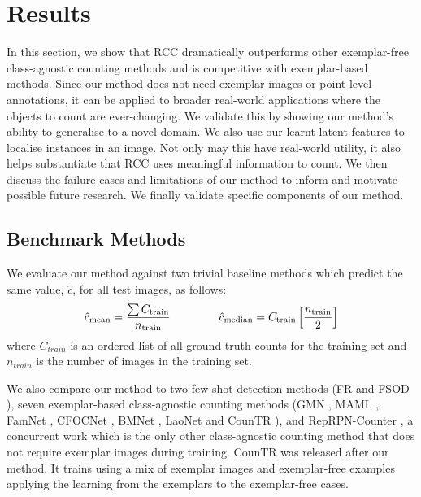 \documentclass[../thesis.tex]{subfiles}
\begin{document}
\section{Results}
In this section, we show that RCC dramatically outperforms other exemplar-free class-agnostic counting methods and is competitive with exemplar-based methods. Since our method does not need exemplar images or point-level annotations, it can be applied to broader real-world applications where the objects to count are ever-changing. 
We validate this by showing our method's ability to generalise to a novel domain. 
We also use our learnt latent features to localise instances in an image.
Not only may this have real-world utility, it also helps substantiate that RCC uses meaningful information to count. We then discuss the failure cases and limitations of our method to inform and motivate possible future research. We finally validate specific components of our method.

\subsection{Benchmark Methods}\label{sec__LTCA__benchmarking_methods}
We evaluate our method against two trivial baseline methods which predict the same value, $\hat{c}$, for all test images, as follows:
\begin{equation}
    \hat{c}_{\text{mean}} = \frac{\sum C_{\text{train}}}{n_{\text{train}}}\hspace{15mm}
 \hat{c}_{\text{median}} = C_{\text{train}}\left[\frac{n_{\text{train}}}{2}\right]
 \end{equation}
where $C_{train}$ is an ordered list of all ground truth counts for the training set and $n_{train}$ is the number of images in the training set.

We also compare our method to two few-shot detection methods (FR \cite{kang2019few} and FSOD \cite{fan2020few}), seven exemplar-based class-agnostic counting methods (GMN \cite{Lu18}, MAML \cite{finn2017model}, FamNet \cite{ranjan2021Famnet}, CFOCNet  \cite{yang2021cfoc}, BMNet \cite{shi2022represent}, LaoNet \cite{lin2021object} and  CounTR \cite{liu2022countr}), and RepRPN-Counter \cite{ranjan2022exemplar}, a concurrent work which is the only other class-agnostic counting method that does not require exemplar images during training. 
CounTR was released after our method.
It trains using a mix of exemplar images and exemplar-free examples applying the learning from the exemplars to the exemplar-free cases.
\end{document}
